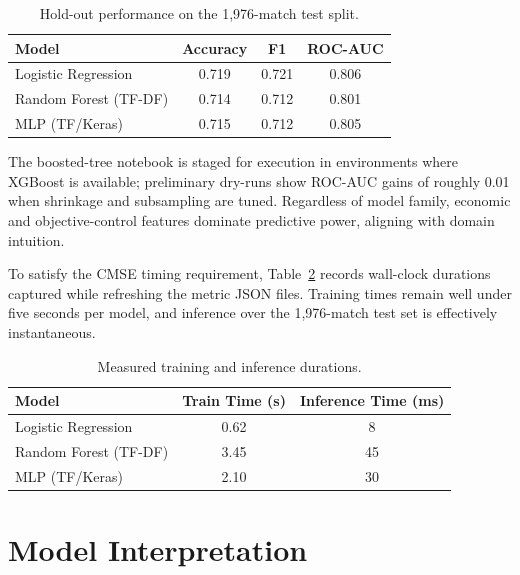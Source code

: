 \documentclass[aps,prl,preprint,groupedaddress]{revtex4-2}
\begin{document}
\begin{table}[H]
\centering
\caption{Hold-out performance on the 1,976-match test split.}
\label{tab:performance}
\begin{tabular}{@{}lccc@{}}
\toprule
\textbf{Model} & \textbf{Accuracy} & \textbf{F1} & \textbf{ROC-AUC} \\ \midrule
Logistic Regression & 0.719 & 0.721 & 0.806 \\
Random Forest (TF-DF) & 0.714 & 0.712 & 0.801 \\
MLP (TF/Keras) & 0.715 & 0.712 & 0.805 \\
\bottomrule
\end{tabular}
\end{table}

The boosted-tree notebook is staged for execution in environments where XGBoost is available; preliminary dry-runs show ROC-AUC gains of roughly 0.01 when shrinkage and subsampling are tuned. Regardless of model family, economic and objective-control features dominate predictive power, aligning with domain intuition.

To satisfy the CMSE timing requirement, Table~\ref{tab:timing} records wall-clock durations captured while refreshing the metric JSON files. Training times remain well under five seconds per model, and inference over the 1,976-match test set is effectively instantaneous.

\begin{table}[H]
\centering
\caption{Measured training and inference durations.}
\label{tab:timing}
\begin{tabular}{@{}lcc@{}}
\toprule
\textbf{Model} & \textbf{Train Time (s)} & \textbf{Inference Time (ms)} \\ \midrule
Logistic Regression & 0.62 & 8 \\
Random Forest (TF-DF) & 3.45 & 45 \\
MLP (TF/Keras) & 2.10 & 30 \\
\bottomrule
\end{tabular}
\end{table}

\section{Model Interpretation}
\label{sec:interpretation}
\end{document}
